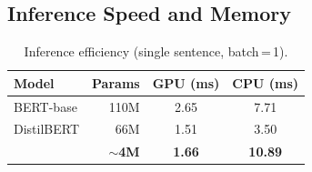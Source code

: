 \begin{table}[h]
\centering
\caption{Ablation on CoNLL-2003 (F1).  ``Medium'' = medium noise level.}
\label{tab:ablation}
\end{table}

\subsection{Inference Speed and Memory}

\begin{table}[h]
\centering
\caption{Inference efficiency (single sentence, batch\,=\,1).}
\label{tab:speed}
\begin{tabular}{lrcc}
\toprule
\textbf{Model} & \textbf{Params} & \textbf{GPU (ms)} & \textbf{CPU (ms)} \\
\midrule
BERT-base  & 110M & 2.65 &  7.71 \\
DistilBERT &  66M & 1.51 &  3.50 \\
\textbf{\LightRet{}} & \textbf{$\sim$4M} & \textbf{1.66} & \textbf{10.89} \\
\bottomrule
\end{tabular}
\end{table}
